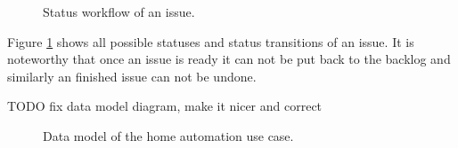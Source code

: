 \begin{figure}[!htb]
  \caption{Status workflow of an issue.}
  \label{fig:statetransition}
\end{figure}

Figure \ref{fig:statetransition} shows all possible statuses and status transitions of an issue. It is noteworthy that once an issue is ready it can not be put back to the backlog and similarly an finished issue can not be undone.

TODO fix data model diagram, make it nicer and correct
\begin{figure}[!htb]
  \caption{Data model of the home automation use case.}
\end{figure}

